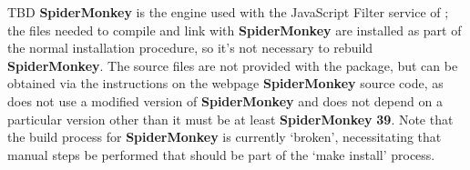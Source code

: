 \tertiaryEnd
{}
TBD
\tertiaryEnd
\secondaryEnd
{}
\textbf{SpiderMonkey} is the  engine used with the JavaScript Filter
service of \mplusm{}; the files needed to compile and link with \textbf{SpiderMonkey} are
installed as part of the normal \mplusm{} installation procedure, so it's not necessary to
rebuild \textbf{SpiderMonkey}.
The source files are not provided with the  package, but can be obtained
via the instructions on the web\longDash{}page
%
{\textbf{SpiderMonkey} source code}, as \mplusm{} does not use a modified version of
\textbf{SpiderMonkey} and does not depend on a particular version \longDash{} other than
it must be at least \textbf{SpiderMonkey} \textbf{39}.
\newcommand{\spiderversion}{47a1}%
Note that the build process for \textbf{SpiderMonkey} is currently `broken', necessitating
that manual steps be performed that should be part of the `make install' process.
